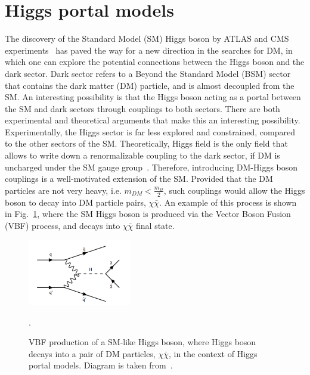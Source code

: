 \section{Higgs portal models}

\graphicspath{{1_TheoreticalBackground/Figures/HiggsPortal}}

The discovery of the Standard Model (SM) Higgs boson by ATLAS and CMS experiments~\cite{Nisati:2015iwc} has paved the way for a new direction
in the searches for DM, in which one can explore the potential connections between the Higgs boson and the dark sector.
Dark sector refers to a Beyond the Standard Model (BSM) sector that contains the dark matter (DM) particle, and is almost decoupled from 
the SM. An interesting possibility is that the Higgs boson acting as a portal between the SM and dark sectors through
couplings to both sectors. There are both experimental and theoretical arguments that make this an interesting possibility.
Experimentally, the Higgs sector is far less explored and constrained, compared to the other sectors of the SM. Theoretically,
Higgs field is the only field that allows to write down a renormalizable
coupling to the dark sector, if DM is uncharged under the SM gauge group~\cite{Argyropoulos:2021sav}. Therefore, introducing 
DM-Higgs boson couplings is a well-motivated extension of the SM. Provided that the DM particles are not very heavy,
i.e. $m_{DM} < \frac{m_H}{2}$, such couplings would allow the Higgs boson to decay into DM particle
pairs, $\chi \bar{\chi}$. An example of this process is shown in Fig.~\ref{fig:vbfhinv_signal_diag}, where the SM Higgs boson
is produced via the Vector Boson Fusion (VBF) process, and decays into $\chi\bar{\chi}$ final state.

\begin{figure}[htbp]
    \centering
    \includegraphics[width=0.4\textwidth]{vbf_signal_diagram.png}
    \caption{VBF production of a SM-like Higgs boson, where Higgs boson decays into a pair of DM particles, $\chi\bar{\chi}$,
    in the context of Higgs portal models. Diagram is taken from~\cite{VBFHinvAnalysisPaper}.}.
    \label{fig:vbfhinv_signal_diag}
\end{figure}

